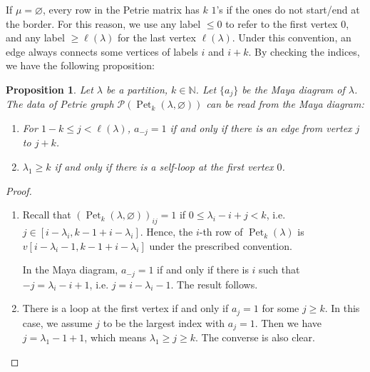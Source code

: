 \documentclass[pdflatex,sn-mathphys-num]{sn-jnl}%
\theoremstyle{thmstyleone}%
\newtheorem{proposition}[theorem]{Proposition}
\theoremstyle{thmstyletwo}%
\theoremstyle{thmstylethree}%
\numberwithin{equation}{section}
\newcommand{\N}{\mathbb{N}}
\DeclareMathOperator{\Pet}{Pet}
\begin{document}
    If $\mu=\varnothing$, every row in the Petrie matrix has $k$ $1$'s if the ones do not start/end at the border. For this reason, we use any label $\leq 0$ to refer to the first vertex $0$, and any label $\geq \ell(\lambda)$ for the last vertex $\ell(\lambda)$. Under this convention, an edge always connects some vertices of labels $i$ and $i+k$. By checking the indices, we have the following proposition:
    \begin{proposition} \label{prop:corr1}
		Let $\lambda$ be a partition, $k\in \N$. Let $\{a_j\}$ be the Maya diagram of $\lambda$. The data of Petrie graph $\mathcal{P}(\Pet_k(\lambda,\varnothing))$ can be read from the Maya diagram:
		\begin{enumerate}
			\item For $1-k\leq j< \ell(\lambda)$, $a_{-j}=1$ if and only if there is an edge from vertex $j$ to $j+k$.
			\item $\lambda_1\geq k$ if and only if there is a self-loop at the first vertex $0$.
		\end{enumerate}
	\end{proposition} 
	\begin{proof}\mbox{}
		\begin{enumerate}
			\item Recall that $(\Pet_k(\lambda,\varnothing))_{ij}=1$ if $0\leq \lambda_i-i+j<k$, i.e. $j\in [i-\lambda_i, k-1+i-\lambda_i]$. Hence, the $i$-th row of $\Pet_k(\lambda)$ is $v[i-\lambda_i-1,k-1+i-\lambda_i]$ under the prescribed convention.
			
			In the Maya diagram, $a_{-j}=1$ if and only if there is $i$ such that $-j=\lambda_i-i+1$, i.e. $j=i-\lambda_i-1$. The result follows.
			\item There is a loop at the first vertex if and only if $a_{j}=1$ for some $j\geq k$. In this case, we assume $j$ to be the largest index with $a_j=1$. Then we have $j=\lambda_1-1+1$, which means $\lambda_1\geq j\geq k$. The converse is also clear.
		\end{enumerate}
	\end{proof}
\end{document}
